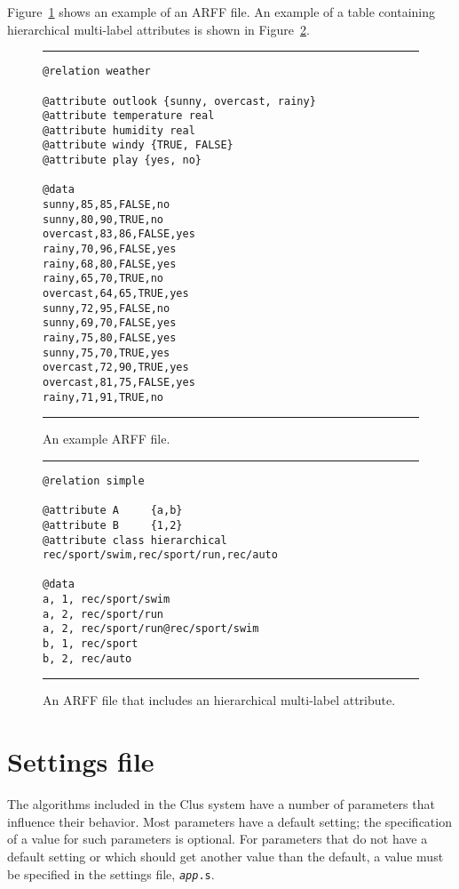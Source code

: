 \documentclass[a4paper]{report}
\begin{document}
Figure~\ref{arff:fig} shows an example of an ARFF file.  An example of a table containing hierarchical multi-label attributes is shown in Figure~\ref{arffhmc:fig}.

\begin{figure}
\hrule
\begin{verbatim}
@relation weather

@attribute outlook {sunny, overcast, rainy}
@attribute temperature real
@attribute humidity real
@attribute windy {TRUE, FALSE}
@attribute play {yes, no}

@data
sunny,85,85,FALSE,no
sunny,80,90,TRUE,no
overcast,83,86,FALSE,yes
rainy,70,96,FALSE,yes
rainy,68,80,FALSE,yes
rainy,65,70,TRUE,no
overcast,64,65,TRUE,yes
sunny,72,95,FALSE,no
sunny,69,70,FALSE,yes
rainy,75,80,FALSE,yes
sunny,75,70,TRUE,yes
overcast,72,90,TRUE,yes
overcast,81,75,FALSE,yes
rainy,71,91,TRUE,no
\end{verbatim}
\hrule
\caption{An example ARFF file.}
\label{arff:fig}
\end{figure}


\begin{figure}
\hrule
\begin{verbatim}
@relation simple

@attribute A     {a,b}
@attribute B     {1,2}
@attribute class hierarchical rec/sport/swim,rec/sport/run,rec/auto

@data
a, 1, rec/sport/swim
a, 2, rec/sport/run
a, 2, rec/sport/run@rec/sport/swim
b, 1, rec/sport
b, 2, rec/auto
\end{verbatim}
\hrule
\caption{An ARFF file that includes an hierarchical multi-label attribute.}
\label{arffhmc:fig}
\end{figure}

\chapter{Settings file}

The algorithms included in the Clus system have a number of parameters that influence their behavior.  Most parameters have a default setting; the specification of a value for such parameters is optional.  For parameters that do not have a default setting or which should get another value than the default, a value must be specified in the settings file, {\tt {\em app}.s}.
\end{document}
